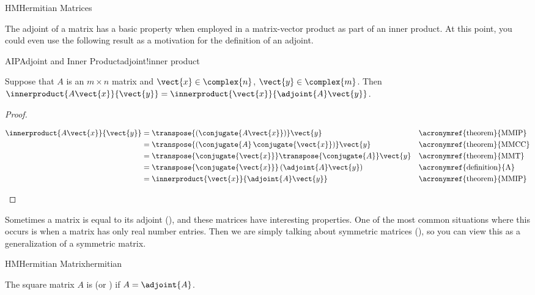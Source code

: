 \begin{subsect}{HM}{Hermitian Matrices}
%
\begin{para}The adjoint of a matrix has a basic property when employed in a matrix-vector product as part of an inner product.  At this point, you could even use the following result as a motivation for the definition of an adjoint.\end{para}
%
\begin{theorem}{AIP}{Adjoint and Inner Product}{adjoint!inner product}
\begin{para}Suppose that $A$ is an $m\times n$ matrix and $\vect{x}\in\complex{n}$, $\vect{y}\in\complex{m}$.  Then $\innerproduct{A\vect{x}}{\vect{y}}=\innerproduct{\vect{x}}{\adjoint{A}\vect{y}}$.\end{para}
\end{theorem}
%
\begin{proof}
%
\begin{para}
\begin{align*}
\innerproduct{A\vect{x}}{\vect{y}}
&=\transpose{\left(\conjugate{A\vect{x}}\right)}\vect{y}
&&\text{\acronymref{theorem}{MMIP}}\\
&=\transpose{\left(\conjugate{A}\,\conjugate{\vect{x}}\right)}\vect{y}
&&\text{\acronymref{theorem}{MMCC}}\\
&=\transpose{\conjugate{\vect{x}}}\transpose{\conjugate{A}}\vect{y}
&&\text{\acronymref{theorem}{MMT}}\\
&=\transpose{\conjugate{\vect{x}}}\left(\adjoint{A}\vect{y}\right)
&&\text{\acronymref{definition}{A}}\\
&=\innerproduct{\vect{x}}{\adjoint{A}\vect{y}}
&&\text{\acronymref{theorem}{MMIP}}
\end{align*}
\end{para}
%
\end{proof}
%
\begin{para}Sometimes a matrix is equal to its adjoint (), and these matrices have interesting properties.  One of the most common situations where this occurs is when a matrix has only real number entries.  Then we are simply talking about symmetric matrices (), so you can view this as a generalization of a symmetric matrix.\end{para}
%
\begin{definition}{HM}{Hermitian Matrix}{hermitian}
\begin{para}The square matrix $A$ is  (or ) if $A=\adjoint{A}$.\end{para}

\end{definition}
\end{subsect}
